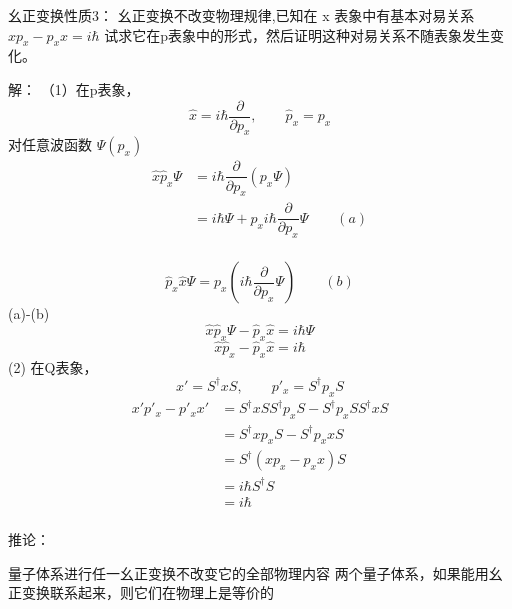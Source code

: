 \begin{frame} 
    \begin{tcolorbox1}{幺正变换性质3：}
        幺正变换不改变物理规律,已知在 x 表象中有基本对易关系$xp_x-p_x x =i\hbar$ 试求它在p表象中的形式，然后证明这种对易关系不随表象发生变化。
    \end{tcolorbox1}
    \alert{解：} （1）在p表象， $$ \hat{x}=i\hbar\dfrac{\partial}{\partial p_x}, \qquad \hat{p}_x=p_x $$
     对任意波函数 $\Psi(p_x)$
    \begin{equation*}
        \begin{split}
            \hat{x}\hat{p}_x\Psi &= i\hbar\dfrac{\partial}{\partial p_x} (p_x \Psi )\\
            &= i\hbar\Psi + p_xi\hbar\dfrac{\partial}{\partial p_x}\Psi \qquad (a)\\
        \end{split} 
    \end{equation*} 

\end{frame}  
\begin{frame} 
    $$\hat{p}_x\hat{x}\Psi = p_x(i\hbar\dfrac{\partial}{\partial p_x}\Psi) \qquad (b)$$
    (a)-(b)
    $$\hat{x}\hat{p}_x\Psi-\hat{p}_x\hat{x}=i\hbar\Psi$$
    $$\hat{x}\hat{p}_x-\hat{p}_x\hat{x}=i\hbar$$
    (2) 在Q表象，$$ x'= S^\dagger x S, \qquad p'_x= S^\dagger p_x S $$
    \begin{equation*}
        \begin{split}
        x'p'_x-p'_x x' &= S^\dagger x S S^\dagger p_x S - S^\dagger p_x S S^\dagger x S \\
        &= S^\dagger x p_x S - S^\dagger p_x x S \\
        &= S^\dagger (x p_x -  p_x x) S \\
        &= i\hbar S^\dagger S \\
        &= i\hbar \\
        \end{split} 
    \end{equation*} 
\end{frame}  
\begin{frame}
    \begin{tcolorbox2}{推论：}
       \begin{enumerate}
           \Item 量子体系进行任一幺正变换不改变它的全部物理内容
           \Item 两个量子体系，如果能用幺正变换联系起来，则它们在物理上是等价的
       \end{enumerate} 
    \end{tcolorbox2}
\end{frame}


